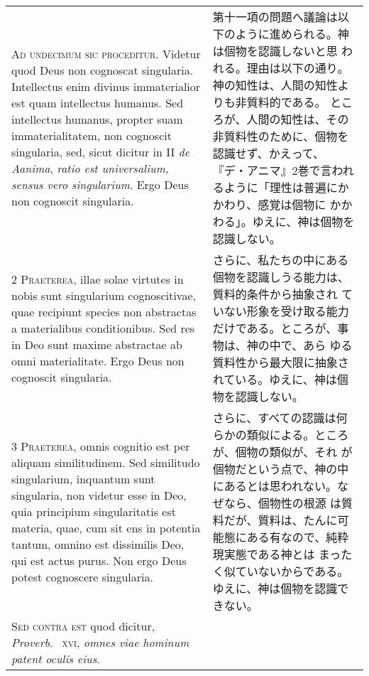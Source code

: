 \documentclass[10pt]{jsarticle} %
\begin{document}
\begin{longtable}{p{21em}p{21em}}



{\huge A}{\scshape d undecimum sic proceditur}. Videtur quod Deus non
cognoscat singularia. Intellectus enim divinus immaterialior est quam
intellectus humanus. Sed intellectus humanus, propter suam
immaterialitatem, non cognoscit singularia, sed, sicut dicitur in II
{\itshape de Aanima}, {\itshape ratio est universalium, sensus vero
singularium}. Ergo Deus non cognoscit singularia.


&

第十一項の問題へ議論は以下のように進められる。神は個物を認識しないと思
われる。理由は以下の通り。神の知性は、人間の知性よりも非質料的である。
ところが、人間の知性は、その非質料性のために、個物を認識せず、かえって、
『デ・アニマ』2巻で言われるように「理性は普遍にかかわり、感覚は個物に
かかわる」。ゆえに、神は個物を認識しない。

\\


{\scshape 2 Praeterea}, illae solae virtutes in nobis sunt singularium
cognoscitivae, quae recipiunt species non abstractas a materialibus
conditionibus. Sed res in Deo sunt maxime abstractae ab omni
materialitate. Ergo Deus non cognoscit singularia.


&

さらに、私たちの中にある個物を認識しうる能力は、質料的条件から抽象され
ていない形象を受け取る能力だけである。ところが、事物は、神の中で、あら
ゆる質料性から最大限に抽象されている。ゆえに、神は個物を認識しない。

\\


{\scshape 3 Praeterea}, omnis cognitio est per aliquam
similitudinem. Sed similitudo singularium, inquantum sunt singularia,
non videtur esse in Deo, quia principium singularitatis est materia,
quae, cum sit ens in potentia tantum, omnino est dissimilis Deo, qui
est actus purus. Non ergo Deus potest cognoscere singularia.


&

さらに、すべての認識は何らかの類似による。ところが、個物の類似が、それ
が個物だという点で、神の中にあるとは思われない。なぜなら、個物性の根源
は質料だが、質料は、たんに可能態にある有なので、純粋現実態である神とは
まったく似ていないからである。ゆえに、神は個物を認識できない。

\\


{\scshape Sed contra est} quod dicitur, {\itshape Proverb}.~{\scshape
xvi}, {\itshape omnes viae hominum patent oculis eius}.


\end{longtable}
\end{document}
